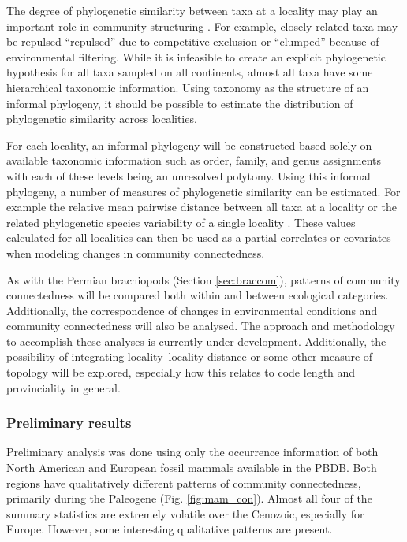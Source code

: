 \documentclass[12pt,letterpaper]{article}
\begin{document}
The degree of phylogenetic similarity between taxa at a locality may play an important role in community structuring \citep{Webb2002}. For example, closely related taxa may be repulsed ``repulsed'' due to competitive exclusion or ``clumped'' because of environmental filtering. While it is infeasible to create an explicit phylogenetic hypothesis for all taxa sampled on all continents, almost all taxa have some hierarchical taxonomic information. Using taxonomy as the structure of an informal phylogeny, it should be possible to estimate the distribution of phylogenetic similarity across localities.

For each locality, an informal phylogeny will be constructed based solely on available taxonomic information such as order, family, and genus assignments with each of these levels being an unresolved polytomy. Using this informal phylogeny, a number of measures of phylogenetic similarity can be estimated. For example the relative mean pairwise distance between all taxa at a locality \citep{Webb2002} or the related phylogenetic species variability of a single locality \citep{Helmus2007a}. These values calculated for all localities can then be used as a partial correlates or covariates when modeling changes in community connectedness.

As with the Permian brachiopods (Section \ref{sec:braccom}), patterns of community connectedness will be compared both within and between ecological categories. Additionally, the correspondence of changes in environmental conditions and community connectedness will also be analysed. The approach and methodology to accomplish these analyses is currently under development. Additionally, the possibility of integrating locality--locality distance or some other measure of topology will be explored, especially how this relates to code length and provinciality in general.


\subsubsection{Preliminary results} \label{mamcomres}
Preliminary analysis was done using only the occurrence information of both North American and European fossil mammals available in the PBDB. Both regions have qualitatively different patterns of community connectedness, primarily during the Paleogene (Fig. \ref{fig:mam_con}). Almost all four of the summary statistics are extremely volatile over the Cenozoic, especially for Europe. However, some interesting qualitative patterns are present. 
\end{document}
